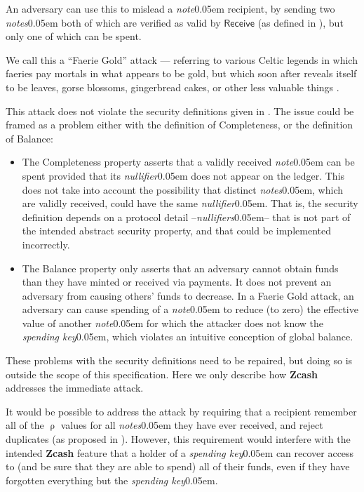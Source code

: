\documentclass{article}
\renewcommand{\emph}[1]{\hspace{0.15em}{\fontfamily{pnc}\selectfont\scalebox{1.02}[0.999]{\textit{#1}}}\hspace{0.02em}}
\newcommand{\term}[1]{\textsl{#1}\kern 0.05em\xspace}
\newcommand{\termbf}[1]{\textbf{#1}\xspace}
\newcommand{\Zcash}{\termbf{Zcash}}
\newcommand{\note}{\term{note}}
\newcommand{\notes}{\term{notes}}
\newcommand{\nullifier}{\term{nullifier}}
\newcommand{\nullifiers}{\term{nullifiers}}
\newcommand{\spendingKey}{\term{spending key}}
\newcommand{\NoteAddressRand}{\mathsf{\uprho}}
\newcommand{\Receive}{\mathsf{Receive}}
\begin{document}
An adversary can use this to mislead a \note recipient, by sending
two \notes both of which are verified as valid by $\Receive$ (as
defined in \cite[Figure 2]{BCG+2014}), but only one of
which can be spent.

We call this a ``Faerie Gold'' attack --- referring to various Celtic
legends in which faeries pay mortals in what appears to be gold,
but which soon after reveals itself to be leaves, gorse blossoms,
gingerbread cakes, or other less valuable things \cite{LG2004}.

This attack does not violate the security definitions given in
\cite{BCG+2014}. The issue could be framed as a problem
either with the definition of Completeness, or the definition of
Balance:

\begin{itemize}
  \item The Completeness property asserts that a validly received
\note can be spent provided that its \nullifier does not appear
on the ledger. This does not take into account the possibility
that distinct \notes, which are validly received, could have the
same \nullifier. That is, the security definition depends on
a protocol detail --\nullifiers-- that is not part of the
intended abstract security property, and that could be implemented
incorrectly.
  \item The Balance property only asserts that an adversary cannot
obtain \emph{more} funds than they have minted or received via
payments. It does not prevent an adversary from causing others'
funds to decrease. In a Faerie Gold attack, an adversary can cause
spending of a \note to reduce (to zero) the effective value of another
\note for which the attacker does not know the \spendingKey, which
violates an intuitive conception of global balance.
\end{itemize}

These problems with the security definitions need to be repaired,
but doing so is outside the scope of this specification. Here we
only describe how \Zcash addresses the immediate attack.

It would be possible to address the attack by requiring that a
recipient remember all of the $\NoteAddressRand$ values for all
\notes they have ever received, and reject duplicates (as proposed
in \cite{GGM2016}). However, this requirement would interfere
with the intended \Zcash feature that a holder of a \spendingKey
can recover access to (and be sure that they are able to spend) all
of their funds, even if they have forgotten everything but the
\spendingKey.
\end{document}
